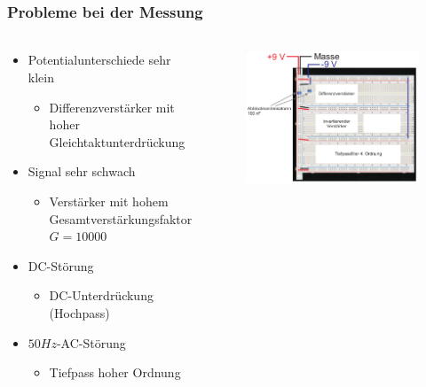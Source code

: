 \begin{frame}
    \frametitle{Probleme bei der Messung}
    \framesubtitle{}
    \begin{columns}[c]
    \begin{block}{}
        \begin{itemize}
            \item Potentialunterschiede sehr klein
            \begin{itemize}
                \item Differenzverstärker mit hoher
                Gleichtaktunterdrückung
            \end{itemize}
            \item Signal sehr schwach
                \begin{itemize}
                    \item Verstärker mit hohem Gesamtverstärkungsfaktor $G=10000$
                \end{itemize}
            \item DC-Störung
                \begin{itemize}
                    \item DC-Unterdrückung (Hochpass)
                \end{itemize}
            \item $50Hz$-AC-Störung
            \pause
                \begin{itemize}
                    \item Tiefpass hoher Ordnung
                \end{itemize}
        \end{itemize}
    \end{block}
    \begin{figure}[H]
    \begin{center}
            \includegraphics[scale=0.22]{./img/schaltung/gesamt_3.png}
    \end{center}
    \end{figure}
    \end{columns}
\end{frame}

